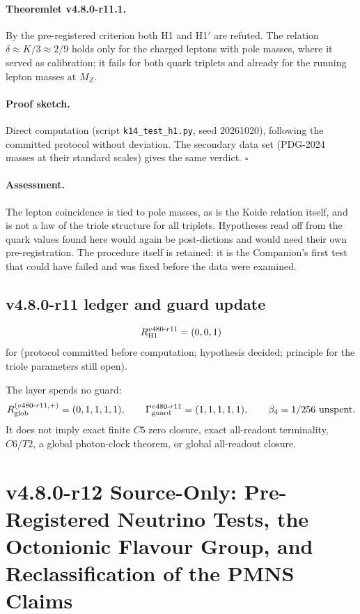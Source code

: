 \paragraph{Theoremlet v4.8.0-r11.1.}
By the pre-registered criterion both H1 and H1\('\) are refuted.  The relation
\(\delta\approx K/3\approx2/9\) holds only for the charged leptons with pole masses, where it served as
calibration; it fails for both quark triplets and already for the running lepton masses at \(M_Z\).

\paragraph{Proof sketch.}
Direct computation (script \texttt{k14\_test\_h1.py}, seed 20261020), following the committed protocol
without deviation.  The secondary data set (PDG-2024 masses at their standard scales) gives the same
verdict.  \(\square\)

\paragraph{Assessment.}
The lepton coincidence is tied to pole masses, as is the Koide relation itself, and is not a law of the
triole structure for all triplets.  Hypotheses read off from the quark values found here would again be
post-dictions and would need their own pre-registration.  The procedure itself is retained: it is the
Companion's first test that could have failed and was fixed before the data were examined.

\subsection*{v4.8.0-r11 ledger and guard update}
\label{subsec:v480-r11-ledger-guard}

\[
R_{\rm H1}^{v480\text{-}r11}=(0,0,1)
\]
for (protocol committed before computation; hypothesis decided; principle for the triole parameters
still open).

The layer spends no guard:
\[
R_{\rm glob}^{(v480\text{-}r11,+)}=(0,1,1,1,1),
\qquad
\Gamma_{\rm guard}^{v480\text{-}r11}=(1,1,1,1,1),
\qquad
\beta_4=1/256\ \text{unspent}.
\]
It does not imply exact finite \(C5\) zero closure, exact all-readout terminality,
\(C6/T2\), a global photon-clock theorem, or global all-readout closure.


\clearpage
\section*{v4.8.0-r12 Source-Only: Pre-Registered Neutrino Tests, the Octonionic Flavour Group, and Reclassification of the PMNS Claims}
\label{sec:v480-r12-neutrino-flavour}

